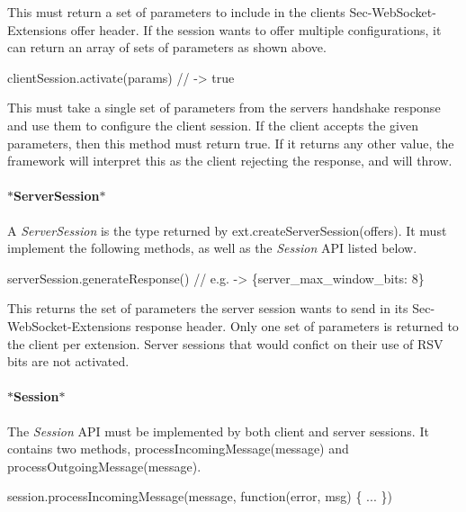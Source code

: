 This must return a set of parameters to include in the client\textquotesingle{}s {\ttfamily Sec-\/\+Web\+Socket-\/\+Extensions} offer header. If the session wants to offer multiple configurations, it can return an array of sets of parameters as shown above.


\begin{DoxyCode}
clientSession.activate(params) // -> true
\end{DoxyCode}


This must take a single set of parameters from the server\textquotesingle{}s handshake response and use them to configure the client session. If the client accepts the given parameters, then this method must return {\ttfamily true}. If it returns any other value, the framework will interpret this as the client rejecting the response, and will {\ttfamily throw}.

\paragraph*{$\ast$\+Server\+Session$\ast$}

A {\itshape Server\+Session} is the type returned by {\ttfamily ext.\+create\+Server\+Session(offers)}. It must implement the following methods, as well as the {\itshape Session} A\+PI listed below.


\begin{DoxyCode}
serverSession.generateResponse()
// e.g.  -> \{server\_max\_window\_bits: 8\}
\end{DoxyCode}


This returns the set of parameters the server session wants to send in its {\ttfamily Sec-\/\+Web\+Socket-\/\+Extensions} response header. Only one set of parameters is returned to the client per extension. Server sessions that would confict on their use of R\+SV bits are not activated.

\paragraph*{$\ast$\+Session$\ast$}

The {\itshape Session} A\+PI must be implemented by both client and server sessions. It contains two methods, {\ttfamily process\+Incoming\+Message(message)} and {\ttfamily process\+Outgoing\+Message(message)}.


\begin{DoxyCode}
session.processIncomingMessage(message, function(error, msg) \{ ... \})
\end{DoxyCode}


